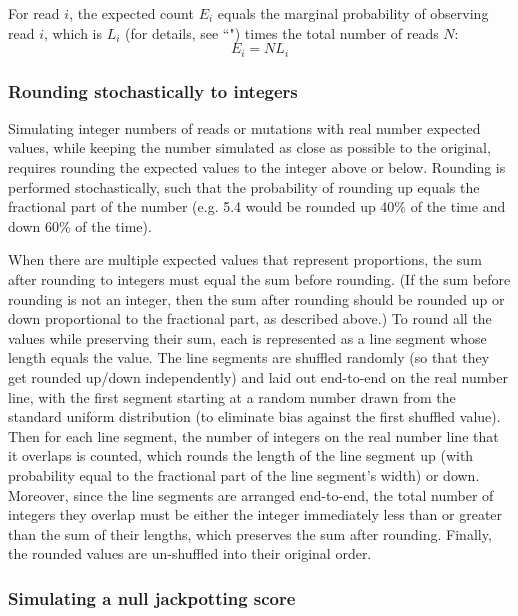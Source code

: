 \documentclass[11pt]{article}
\begin{document}
For read $i$, the expected count $E_i$ equals the marginal probability of observing read $i$, which is $L_i$ (for details, see ``") times the total number of reads $N$:
$$E_i = NL_i$$

\subsubsection{Rounding stochastically to integers}
\label{stochastic-round}

Simulating integer numbers of reads or mutations with real number expected values, while keeping the number simulated as close as possible to the original, requires rounding the expected values to the integer above or below.
Rounding is performed stochastically, such that the probability of rounding up equals the fractional part of the number (e.g. 5.4 would be rounded up 40\% of the time and down 60\% of the time).

When there are multiple expected values that represent proportions, the sum after rounding to integers must equal the sum before rounding.
(If the sum before rounding is not an integer, then the sum after rounding should be rounded up or down proportional to the fractional part, as described above.)
To round all the values while preserving their sum, each is represented as a line segment whose length equals the value.
The line segments are shuffled randomly (so that they get rounded up/down independently) and laid out end-to-end on the real number line, with the first segment starting at a random number drawn from the standard uniform distribution (to eliminate bias against the first shuffled value).
Then for each line segment, the number of integers on the real number line that it overlaps is counted, which rounds the length of the line segment up (with probability equal to the fractional part of the line segment's width) or down.
Moreover, since the line segments are arranged end-to-end, the total number of integers they overlap must be either the integer immediately less than or greater than the sum of their lengths, which preserves the sum after rounding.
Finally, the rounded values are un-shuffled into their original order.

\subsubsection{Simulating a null jackpotting score}
\label{sim-null-jackpotting-score}
\end{document}
